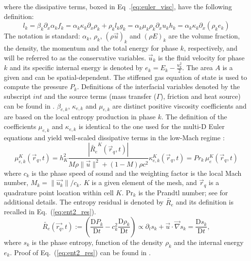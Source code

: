 \documentclass{anstrans}
\newcommand{\grad}{\vec{\nabla}}
\renewcommand{\Pr}{\textrm{Pr}}
\newcommand{\resi}{R_e}
\newcommand{\resinew}{\widetilde{\resi}}
\newcommand{\matder}[1]{\frac{\textrm{D} #1}{\textrm{D} t}}
\newcommand{\eqt}[1]{Eq.~(\ref{#1})}                     %
\begin{document}
where the dissipative terms, boxed in Eq~.\ref{eq:euler_visc}, have the following definition:
\begin{subequations}
%
\begin{equation}
  l_k = \beta_k \partial_x \alpha_k 
\end{equation}
%  
\begin{equation}
  f_k = \alpha_k \kappa_k \partial_x \rho_k + \rho_k l_k 
\end{equation}
%  
\begin{equation}
  g_k = \alpha_k \mu_k \rho_k \partial_x u_k 
\end{equation}  
%
\begin{equation}
  h_k =  \alpha_k \kappa_k \partial_x \left( \rho_k e_k \right)
 \end{equation}
%
\end{subequations}
The notation is standard: $\alpha_k$, $\rho_k$, $(\rho \vec{u})_k$ and $(\rho E)_k$ are the volume fraction, the density, the momentum and the total energy for phase $k$, respectively, and will be referred to as the conservative variables. $\vec{u}_k$ is the fluid velocity for phase $k$ and its specific internal energy is denoted by $e_k=E_k-\tfrac{u^2_k}{2}$. The area $A$ is a given and can be spatial-dependent. The stiffened gas equation of state \cite{SGEOS} is used to compute the pressure $P_k$. Definitions of the interfacial variables denoted by the subscript $int$ and the source terms (mass transfer ($\Gamma$), friction and heat source) can be found in \cite{berry}. $\beta_{e,k}$, $\kappa_{e,k}$ and $\mu_{e,k}$ are distinct positive viscosity coefficients and are based on the local entropy production in phase $k$. The definition of the coefficients $\mu_{e,k}$ and $\kappa_{e,k}$ is identical to the one used for the multi-D Euler equations \cite{marco_inl_report} and yield well-scaled dissipative terms in the low-Mach regime \cite{LowMach1, LowMach2, LowMach3}:
%
\begin{subequations}
\label{eq:ent_visc_coeff2}
\begin{equation}
\mu^K_{e,k}(\vec{r}_q,t) =  h_K^2 \frac{| \resinew^K(\vec{r}_q,t) |}{M \rho \|\vec{u}\|^2 + (1-M) \rho c^2}  
\end{equation}
\begin{equation}
\kappa^K_{e,k}(\vec{r}_q,t) = Pr_k \, \mu^K_e(\vec{r}_q,t)
\end{equation}
\end{subequations}
%
where $c_k$ is the phase speed of sound and the weighting factor is the local Mach number, $M_k=\|\vec{u_k}\|/c_k$. $K$ is a given element of the mesh, and $\vec{r}_q$ is a quadrature point location within cell $K$. $\Pr_k$ is the Prandtl number; see \cite{jlg1} for additional details. The entropy residual is denoted by $\resinew$ and its definition is recalled in \eqt{eq:ent2_res}.  
%
\begin{equation}
\label{eq:ent2_res}
\resinew(\vec{r_q},t) := \left( \matder{P_k} - c^2_k \matder{\rho_k} \right) \propto \partial_t s_k + \vec{u} \cdot \grad s_k = \matder{s_k},
\end{equation} 
%
where $s_k$ is the phase entropy, function of the density $\rho_k$ and the internal energy $e_k$. Proof of \eqt{eq:ent2_res} can be found in \cite{marco_inl_report}.
\end{document}
